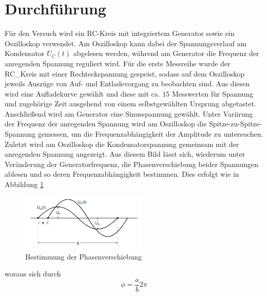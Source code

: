 \section{Durchführung}
Für den Versuch wird ein RC-Kreis mit integriertem Generator sowie ein Oszilloskop verwendet. Am Oszilloskop kann dabei der
Spannungsverlauf am Kondensator $U_C(t)$ abgelesen werden, während am Generator die Frequenz der anregenden Spannung reguliert wird.
Für die erste Messreihe wurde der RC_Kreis mit einer Rechteckspannung gespeist, sodass auf dem Oszilloskop jeweils Auszüge von Auf- und Entladevorgang 
zu beobachten sind. Aus diesen wird eine Aufladekurve gewählt und diese mit ca. $15$ Messwerten für Spannung und zugehörige Zeit ausgehend von einem 
selbstgewählten Ursprung abgetastet. \\
Anschließend wird am Generator eine Sinusspannung gewählt. Unter Variirung der Frequenz der anregenden Spannung wird am Oszilloskop
die Spitze-zu-Spitze-Spannung gemessen, um die Frequenzabhängigkeit der Amplitude zu untersuchen. \\
Zuletzt wird am Oszilloskop die Kondensatorspannung gemeinsam mit der anregenden Spannung angezeigt. Aus diesem Bild lässt sich, wiederum
unter Veränderung der Generatorfrequenz, die Phasenverschiebung beider Spannungen ablesen und so deren Frequenzabhängigkeit bestimmen.
Dies erfolgt wie in Abbildung \ref{fig:Phasenverschiebung} 
\begin{figure}
\includegraphics[width=6cm, keepaspectratio]{Phasenverschiebung}
\caption{Bestimmung der Phasenverschiebung}
\label{fig:Phasenverschiebung}
\end{figure}
woraus sich durch
\begin{equation}
\phi=\frac{a}{b}2\pi
\end{equation}
